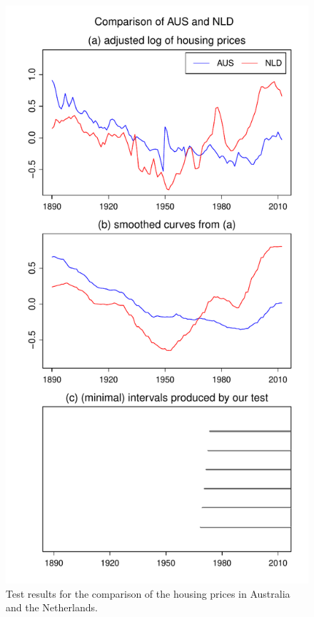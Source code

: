 \documentclass[a4paper,12pt]{article}
\begin{document}
\begin{figure}[b!]
\begin{minipage}[t]{0.49\textwidth}
\includegraphics[width=\textwidth]{Plots/hp/hp_AUS_vs_NLD}
\caption{Test results for the comparison of the housing prices in Australia and the Netherlands.}\label{fig:hp:Australia:Netherlands}
\end{minipage}

\end{figure}
\end{document}
